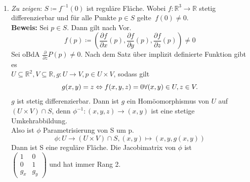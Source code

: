 \begin{solution}
\
  \begin{enumerate}[label=(\alph*)] 
     \item   \emph{Zu zeigen}: \( S \coloneqq f^{-1}(0) \) ist reguläre Fläche. Wobei \( f: \mathbb{R}^3 \to \mathbb{R} \) stetig differenzierbar und für alle Punkte \( p \in S \) gelte \( \ f(0) \neq 0 \). \\
      \textbf{Beweis:} Sei \( p \in S \). Dann gilt nach Vor.
      \begin{equation*}
        f(p) \coloneqq \left(\frac{\partial f}{\partial x}(p), 
        \frac{\partial f}{\partial y}(p), 
        \frac{\partial f}{\partial z}(p) \right) \neq 0
      \end{equation*}
      Sei oBdA \( \frac{\partial}{\partial z} P(p) \neq 0 \). Nach dem Satz über implizit definierte Funktion gibt es\\
      \( U \subseteq \mathbb{R}^2, V \subseteq \mathbb{R}, g: U \to V, p \in U \times V \), sodass gilt\\
      \begin{equation*}
        g(x,y) = z \Leftrightarrow f(x,y,z) = 0 \hfill \forall (x,y) \in U, z \in V. \\
      \end{equation*}
      \( g \) ist stetig differenzierbar. Dann ist \( g \) ein Homöomorphismus von \( U \) auf \( (U \times V) \cap S \), denn \( \phi^{-1}:(x,y,z) \to (x,y) \) ist eine stetige Umkehrabbildung. \\
      Also ist \( \phi \) Parametrisierung von S um p.
      \begin{equation*}
        \phi: U \to (U \times V) \cap S, (x,y) \mapsto (x,y,g(x,y))
      \end{equation*}
      Dann ist S eine reguläre Fläche.
      Die Jacobimatrix von \( \phi \) ist\\ 
      \( \begin{pmatrix}
        1 & 0 \\
        0 & 1 \\
        g_x & g_y
      \end{pmatrix} \) und hat immer Rang 2.


\end{enumerate}
\end{solution}
